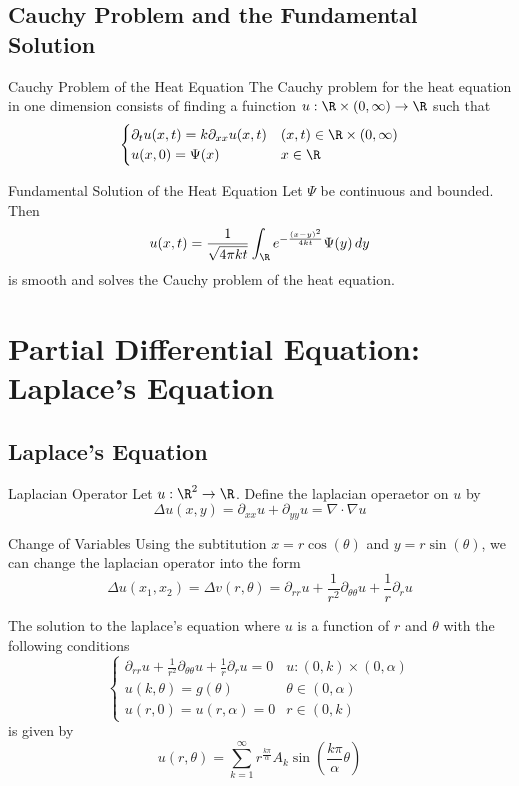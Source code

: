 \documentclass[a4paper]{article}
\begin{document}
\subsection{Cauchy Problem and the Fundamental Solution}
\begin{defn}{Cauchy Problem of the Heat Equation}{} The Cauchy problem for the heat equation in one dimension consists of finding a fuinction $u:\R\times(0,\infty)\to\R$ such that $$\begin{cases}
\partial_{t}u(x,t)=k\partial_{xx}u(x,t) & (x,t)\in\R\times(0,\infty)\\
u(x,0)=\Psi(x) & x\in\R
\end{cases}$$
\end{defn}

\begin{thm}{Fundamental Solution of the Heat Equation}{} Let $\Psi$ be continuous and bounded. Then $$u(x,t)=\frac{1}{\sqrt{4\pi kt}}\int_\R e^{-\frac{(x-y)^2}{4kt}}\Psi(y)\,dy$$ is smooth and solves the Cauchy problem of the heat equation. 
\end{thm}

\pagebreak
\section{Partial Differential Equation: Laplace's Equation}
\subsection{Laplace's Equation}
\begin{defn}{Laplacian Operator}{} Let $u:\R^2\to\R$. Define the laplacian operaetor on $u$ by $$\Delta u(x,y)=\partial_{xx}u+\partial_{yy}u=\nabla\cdot\nabla u$$
\end{defn}

\begin{prp}{Change of Variables}{} Using the subtitution $x=r\cos(\theta)$ and $y=r\sin(\theta)$, we can change the laplacian operator into the form $$\Delta u(x_1,x_2)=\Delta v(r,\theta)=\partial_{rr}u+\frac{1}{r^2}\partial_{\theta\theta}u+\frac{1}{r}\partial_ru$$
\end{prp}

\begin{thm}{}{} The solution to the laplace's equation where $u$ is a function of $r$ and $\theta$ with the following conditions $$\begin{cases}
\partial_{rr}u+\frac{1}{r^2}\partial_{\theta\theta}u+\frac{1}{r}\partial_ru=0 & u:(0,k)\times(0,\alpha)\\
u(k,\theta)=g(\theta) & \theta\in(0,\alpha)\\
u(r,0)=u(r,\alpha)=0 & r\in(0,k)
\end{cases}$$ is given by $$u(r,\theta)=\sum_{k=1}^\infty r^{\frac{k\pi}{\alpha}}A_k\sin\left(\frac{k\pi}{\alpha}\theta\right)$$
\end{thm}
\end{document}
